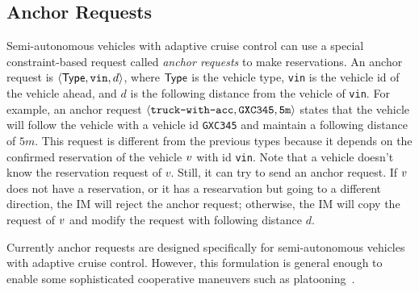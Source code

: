\subsection{Anchor Requests}
\label{sec:anchor}

Semi-autonomous vehicles with adaptive cruise control can use a special
constraint-based request called \emph{anchor requests} to make
reservations. An anchor request is $\langle {\sf Type}, \texttt{vin},
d \rangle$, where ${\sf Type}$ is the vehicle type, \texttt{vin} is
the vehicle id of the vehicle ahead, and $d$ is the following
distance from the vehicle of \texttt{vin}.  For example, an anchor
request $\langle \texttt{truck-with-acc}, \texttt{GXC345}, {\tt 5m}
\rangle$ states that the vehicle will follow the vehicle with a
vehicle id {\tt GXC345} and maintain a following distance of $5m$.
This request is different from the previous types because it depends on the confirmed
reservation of the vehicle $v$ with id \texttt{vin}. Note that a
vehicle doesn't know the reservation request of $v$.
Still, it can try to send an anchor request. If $v$ does not
have a reservation, or it has a researvation but going to a different
direction, the IM will reject the anchor request; otherwise, the IM
will copy the request of $v$ and modify the request with 
following distance $d$.

Currently anchor requests are designed specifically for
semi-autonomous vehicles with adaptive cruise control.  However, this
formulation is general enough to enable some sophisticated cooperative
maneuvers such as platooning~\cite{bib:Sheikholeslam90Longitudinal}.







